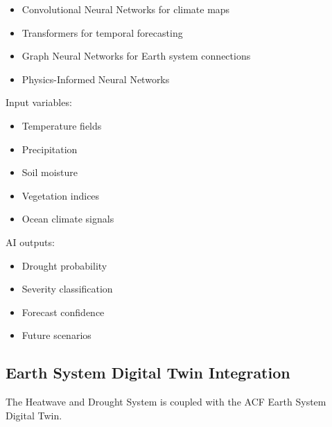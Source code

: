 \begin{itemize}

\item Convolutional Neural Networks for climate maps

\item Transformers for temporal forecasting

\item Graph Neural Networks for Earth system connections

\item Physics-Informed Neural Networks

\end{itemize}


Input variables:

\begin{itemize}

\item Temperature fields

\item Precipitation

\item Soil moisture

\item Vegetation indices

\item Ocean climate signals

\end{itemize}


AI outputs:

\begin{itemize}

\item Drought probability

\item Severity classification

\item Forecast confidence

\item Future scenarios

\end{itemize}



\subsection{Earth System Digital Twin Integration}

The Heatwave and Drought System is coupled with the ACF Earth System
Digital Twin.

